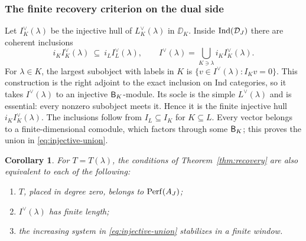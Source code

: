 \documentclass[11pt,reqno]{amsart}
\newtheorem{corollary}[theorem]{Corollary}
\theoremstyle{definition}
\theoremstyle{remark}
\numberwithin{equation}{section}
\begin{document}
\subsubsection{The finite recovery criterion on the dual side}

Let $I_K^\vee(\lambda)$ be the injective hull of $L_K^\vee(\lambda)$
in $\DD_K$. Inside $\operatorname{Ind}(\mathcal D_J)$ there are coherent inclusions
\begin{equation}\label{eq:injective-union}
 i_KI_K^\vee(\lambda)\ \subseteq\ i_LI_L^\vee(\lambda),
 \qquad
 I^\vee(\lambda)=\bigcup_{K\ni\lambda}i_KI_K^\vee(\lambda).
\end{equation}
For $\lambda\in K$, the largest subobject with labels in $K$ is
$\{v\in I^\vee(\lambda):I_Kv=0\}$. This construction is the right
adjoint to the exact inclusion on Ind categories, so it takes
$I^\vee(\lambda)$ to an injective $\mathsf B_K$-module. Its socle is the
simple $L^\vee(\lambda)$ and is essential: every nonzero subobject
meets it. Hence it is the finite injective hull $i_KI_K^\vee(\lambda)$.
The inclusions follow from $I_L\subseteq I_K$ for $K\subseteq L$.
Every vector belongs to a finite-dimensional comodule, which factors
through some $\mathsf B_K$; this proves the union in \eqref{eq:injective-union}.

\begin{corollary}\label{cor:perfect-recovery}
For $T=T(\lambda)$, the conditions of
Theorem~\ref{thm:recovery} are also equivalent to each of the following:
\begin{enumerate}
 \item $T$, placed in degree zero, belongs to $\operatorname{Perf}(A_J)$;
 \item $I^\vee(\lambda)$ has finite length;
 \item the increasing system in \eqref{eq:injective-union} stabilizes
       in a finite window.
\end{enumerate}
\end{corollary}
\end{document}
